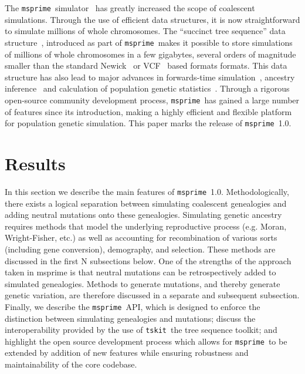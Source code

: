 \documentclass{article}
\newcommand{\msprime}[0]{\texttt{msprime}}
\newcommand{\tskit}[0]{\texttt{tskit}}
\begin{document}
The \msprime\ simulator~\citep{kelleher2016efficient,kelleher2020coalescent}
has greatly increased the scope of coalescent simulations.
Through the use of efficient data structures, it is
now straightforward to simulate millions of whole chromosomes.
The ``succinct tree sequence'' data
structure~\citep{kelleher2016efficient,kelleher2018efficient,kelleher2019inferring,
wohns2021unified},
introduced as part of \msprime\, makes it possible to store simulations
of millions of whole chromosomes in a few gigabytes, several orders
of magnitude smaller than the standard
Newick~\citep{felsenstein1989phylip} or
VCF~\citep{danecek2011variant} based formats formats.
This data structure has
also lead to major advances in forwards-time
simulation~\citep{kelleher2018efficient,haller2018tree},
ancestry inference~\citep{kelleher2019inferring,wohns2021unified}
and calculation of population genetic statistics~\citep{ralph2019efficiently}.
Through a rigorous open-source community development process,
\msprime\ has gained a large number of features since its introduction,
making a highly efficient and flexible platform for population
genetic simulation.
This paper marks the release of \msprime\ 1.0.

%

\section*{Results}

In this section we describe the main features of \msprime\ 1.0. Methodologically,
there exists a logical separation between simulating coalescent genealogies and
adding neutral mutations onto these genealogies. Simulating genetic ancestry
requires methods that model the underlying reproductive process (e.g. Moran,
Wright-Fisher, etc.) as well as accounting for recombination of various sorts
(including gene conversion), demography, and selection. These methods are
discussed in the first N subsections below. One of the strengths of the
approach taken in msprime is that neutral mutations can be retrospectively
added to simulated genealogies. Methods to generate mutations, and thereby
generate genetic variation, are therefore discussed in a separate and subsequent
subsection. Finally, we describe the \msprime\ API, which is designed to enforce
the distinction between simulating genealogies and mutations; discuss the
interoperability provided by the use of \tskit\, the tree sequence toolkit;
and highlight the open source development process which allows for \msprime\
to be extended by addition of new features while ensuring robustness and
maintainability of the core codebase.
\end{document}
